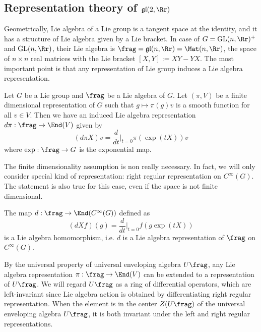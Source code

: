 \subsection{Representation theory of $\mathfrak{gl}(2, \Rr)$}
Geometrically, Lie algebra of a Lie group is a tangent space at the identity, and it has a structure of Lie algebra given by a Lie bracket. In case of $G = \GL(n, \Rr)^{+}$ and $\GL(n, \Rr)$, their Lie algebra is $\frag = \mathfrak{gl}(n, \Rr) = \Mat(n, \Rr)$, the space of $n\times n$ real matrices with the Lie bracket $[X, Y]:= XY - YX$. The most important point is that any representation of Lie group induces a Lie algebra representation. 
\begin{proposition}
Let $G$ be a Lie group and $\frag$ be a Lie algebra of $G$. Let $(\pi, V)$ be a finite dimensional representation of $G$ such that $g\mapsto \pi(g)v$ is a smooth function for all $v\in V$. Then we have an induced Lie algebra representation $d\pi:\frag\to \End(V)$ given by 
$$
(d\pi X)v = \frac{d}{dt}\Big|_{t=0} \pi(\exp(tX))v
$$
where $\exp:\frag \to G$ is the exponential map. 
\end{proposition}
The finite dimensionality assumption is non really necessary. 
In fact, we will only consider special kind of representation: right regular representation on $C^{\infty}(G)$. 
The statement is also true for this case, even if the space is not finite dimensional.
\begin{proposition}
The map $d:\frag \to \End(C^{\infty}(G))$ defined as 
$$
(dXf)(g) = \frac{d}{dt}\Big|_{t=0} f(g\exp(tX))
$$
is a Lie algebra homomorphism, i.e. $d$ is a Lie algebra representation of $\frag$ on $C^{\infty}(G)$. 
\end{proposition}

By the universal property of universal enveloping algebra $U\frag$, any Lie algebra representation $\pi:\frag \to \End(V)$ can be extended to a representation of $U\frag$. 
We will regard $U\frag$ as a ring of differential operators, which are left-invariant since Lie algebra action is obtained by differentiating right regular representation. 
When the element is in the center $Z(U\frag)$ of the universal enveloping algebra $U\frag$, it is both  invariant under the left and right regular representations.


